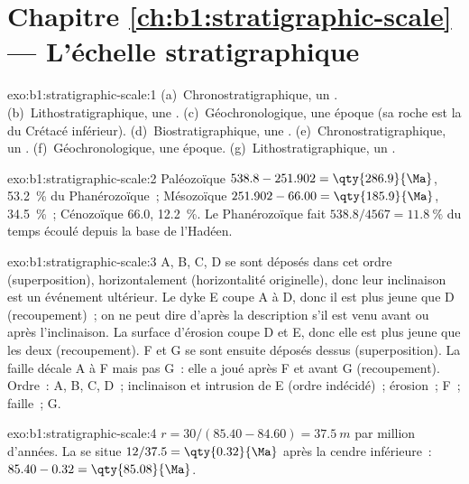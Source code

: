 \section*{Chapitre \ref{ch:b1:stratigraphic-scale} --- L'échelle stratigraphique}

\begin{solution}{exo:b1:stratigraphic-scale:1}
(a)~Chronostratigraphique, un . (b)~Lithostratigraphique, une .
(c)~Géochronologique, une époque (sa roche est la  du Crétacé inférieur).
(d)~Biostratigraphique, une . (e)~Chronostratigraphique, un .
(f)~Géochronologique, une époque. (g)~Lithostratigraphique, un .
\end{solution}

\begin{solution}{exo:b1:stratigraphic-scale:2}
Paléozoïque $538.8 - 251.902 = \qty{286.9}{\Ma}$, \qty{53.2}{\%} du
Phanérozoïque~; Mésozoïque $251.902 - 66.00 = \qty{185.9}{\Ma}$, \qty{34.5}{\%}~;
Cénozoïque \qty{66.0}{\Ma}, \qty{12.2}{\%}. Le Phanérozoïque fait
$538.8/4567 = \qty{11.8}{\%}$ du temps écoulé depuis la base de l'Hadéen.
\end{solution}

\begin{solution}{exo:b1:stratigraphic-scale:3}
A, B, C, D se sont déposés dans cet ordre (superposition), horizontalement (horizontalité
originelle), donc leur inclinaison est un événement ultérieur. Le dyke E coupe A à D, donc il est
plus jeune que D (recoupement)~; on ne peut dire d'après la description s'il est venu avant ou après
l'inclinaison. La surface d'érosion coupe D et E, donc elle est
plus jeune que les deux (recoupement). F et G se sont ensuite déposés dessus
(superposition). La faille décale A à F mais pas G~: elle a joué après F et avant G
(recoupement). Ordre~: A, B, C, D~; inclinaison et intrusion de E (ordre
indécidé)~; érosion~; F~; faille~; G.
\end{solution}

\begin{solution}{exo:b1:stratigraphic-scale:4}
$r = 30/(85.40 - 84.60) = \qty{37.5}{m}$ par million d'années. La 
se situe $12/37.5 = \qty{0.32}{\Ma}$ après la cendre inférieure~: $85.40 - 0.32 =
\qty{85.08}{\Ma}$.
\end{solution}

